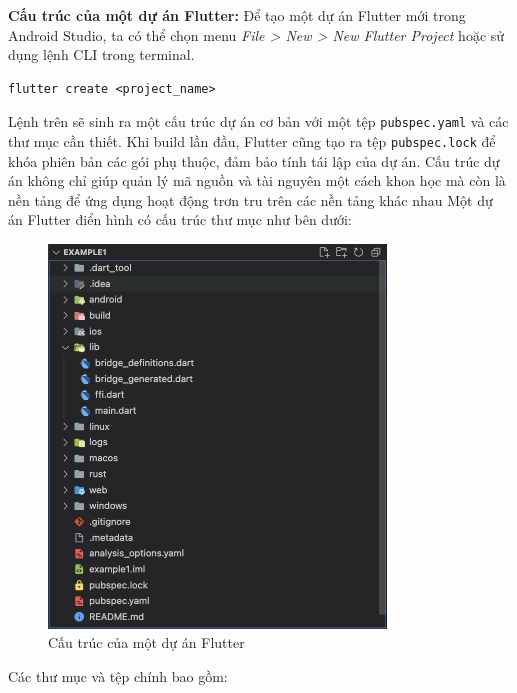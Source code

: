 \documentclass[../DoAn.tex]{subfiles}
\numberwithin{figure}{chapter}
\begin{document}
\textbf{Cấu trúc của một dự án Flutter:}
Để tạo một dự án Flutter mới trong Android Studio, ta có thể chọn menu \textit{File > New > New Flutter Project} hoặc sử dụng lệnh CLI trong terminal.
\begin{lstlisting}
flutter create <project_name>
\end{lstlisting}
Lệnh trên sẽ sinh ra một cấu trúc dự án cơ bản với một tệp \texttt{pubspec.yaml} và các thư mục cần thiết. Khi build lần đầu, Flutter cũng tạo ra tệp \texttt{pubspec.lock} để khóa phiên bản các gói phụ thuộc, đảm bảo tính tái lập của dự án.
Cấu trúc dự án không chỉ giúp quản lý mã nguồn và tài nguyên một cách khoa học mà còn là nền tảng để ứng dụng hoạt động trơn tru trên các nền tảng khác nhau
Một dự án Flutter điển hình có cấu trúc thư mục như bên dưới:
\begin{figure}[H]
    \centering
    \includegraphics[width=0.8\textwidth]{Hinhve/Chuong5/flutterStructure.png}
    \caption{Cấu trúc của một dự án Flutter}
    \label{fig:flutterstructure}
\end{figure}
Các thư mục và tệp chính bao gồm: 
\end{document}
